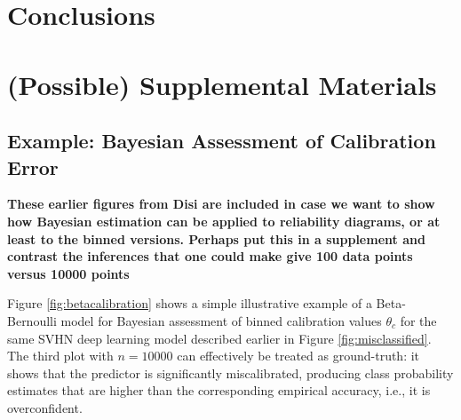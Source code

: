 \documentclass{article}
\begin{document}
\section{Conclusions}

\newpage
\phantom{p}
\newpage  




\newpage
\phantom{p}
\newpage


\section*{(Possible) Supplemental Materials}

\subsection*{Example: Bayesian Assessment of Calibration Error}

{\bf These earlier figures from Disi are included in case we want to show how Bayesian estimation can be applied to reliability diagrams, or at least to the binned versions. Perhaps put this in a supplement and contrast the inferences that one could make give 100 data points versus 10000 points}
  

Figure \ref{fig:betacalibration} shows a simple illustrative example of a Beta-Bernoulli model for Bayesian assessment of binned calibration values $\theta_c$ for the same SVHN deep learning model described earlier in Figure \ref{fig:misclassified}.  
The third plot with $n=10000$ can effectively be treated as ground-truth: it shows that the predictor is significantly miscalibrated, producing class probability estimates that are higher than the corresponding empirical accuracy, i.e., it is overconfident.
\end{document}
